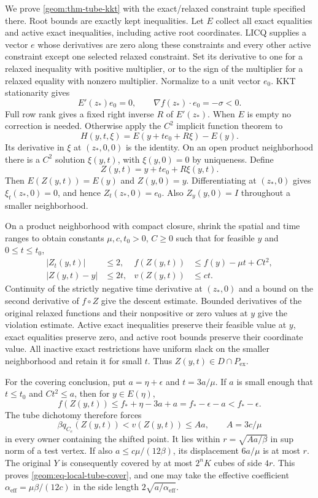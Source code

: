 We prove \cref{geom:thm-tube-kkt} with the exact/relaxed constraint tuple
specified there. Root bounds are exactly kept inequalities. Let $E$
collect all exact equalities and active exact inequalities, including
active root coordinates. LICQ supplies a vector $e$ whose derivatives
are zero along these constraints and every other active constraint
except one selected relaxed constraint. Set its derivative to one for
a relaxed inequality with positive multiplier, or to the sign of the
multiplier for a relaxed equality with nonzero multiplier. Normalize to
a unit vector $e_0$. KKT stationarity gives
\[
 E'(z_*)e_0=0,\qquad \nabla f(z_*)\cdot e_0=-\sigma<0.
\]
Full row rank gives a fixed right inverse $R$ of $E'(z_*)$. When $E$ is
empty no correction is needed. Otherwise apply the $C^2$ implicit
function theorem to
\[
 H(y,t,\xi)=E(y+t e_0+R\xi)-E(y).
\]
Its derivative in $\xi$ at $(z_*,0,0)$ is the identity. On an open
product neighborhood there is a $C^2$ solution $\xi(y,t)$, with
$\xi(y,0)=0$ by uniqueness. Define
\[
 Z(y,t)=y+t e_0+R\xi(y,t).
\]
Then $E(Z(y,t))=E(y)$ and $Z(y,0)=y$. Differentiating at $(z_*,0)$
gives $\xi_t(z_*,0)=0$, and hence $Z_t(z_*,0)=e_0$.
Also $Z_y(y,0)=I$ throughout a smaller neighborhood.

On a product neighborhood with compact closure, shrink the spatial and
time ranges to obtain constants $\mu,c,t_0>0$, $C\geq0$ such that
for feasible $y$ and $0\leq t\leq t_0$,
\begin{align}
 |Z_t(y,t)|&\leq2,&
 f(Z(y,t))&\leq f(y)-\mu t+Ct^2,\label{app:geometry:eq-descent}\\
 |Z(y,t)-y|&\leq2t,&v(Z(y,t))&\leq ct.
 \label{app:geometry:eq-violation}
\end{align}
Continuity of the strictly negative time derivative at $(z_*,0)$ and
a bound on the second derivative of $f\circ Z$ give the descent
estimate. Bounded derivatives of the original relaxed functions and
their nonpositive or zero values at $y$ give the violation estimate.
Active exact inequalities preserve their feasible value at $y$, exact
equalities preserve zero, and active root bounds preserve their
coordinate value. All inactive exact restrictions have uniform slack
on the smaller neighborhood and retain it for small $t$. Thus
$Z(y,t)\in D\cap P_{\mathrm{ex}}$.

For the covering conclusion, put $a=\eta+\epsilon$ and
$t=3a/\mu$. If $a$ is small enough that $t\leq t_0$ and $Ct^2\leq a$,
then for $y\in E(\eta)$,
\begin{equation}\label{app:geometry:eq-superoptimal}
 f(Z(y,t))\leq f_*+\eta-3a+a
                   =f_*-\epsilon-a<f_*-\epsilon.
\end{equation}
The tube dichotomy therefore forces
\[
 \beta q_{C_e}(Z(y,t))<v(Z(y,t))\leq Aa,\qquad A=3c/\mu
\]
in every owner containing the shifted point. It lies within
$r=\sqrt{Aa/\beta}$ in sup norm of a test vertex. If also
$a\leq c\mu/(12\beta)$, its displacement $6a/\mu$ is at most $r$.
The original $Y$ is consequently covered by at most $2^nK$ cubes of
side $4r$. This proves \cref{geom:eq-local-tube-cover}, and one may take
the effective coefficient $\alpha_{\mathrm{eff}}=\mu\beta/(12c)$ in
the side length $2\sqrt{a/\alpha_{\mathrm{eff}}}$.

